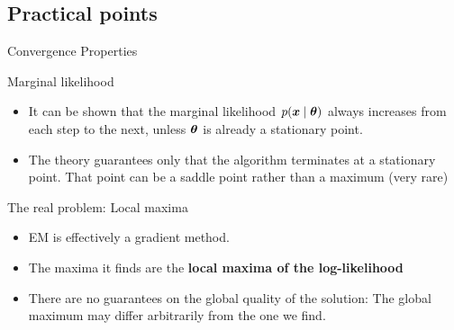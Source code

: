 \documentclass[10pt]{beamer}
\begin{document}
\subsection{Practical points}
\begin{frame}{Convergence Properties}
\footnotesize
\begin{sblock}{Marginal likelihood}
\begin{itemize}
\item It can be shown that the marginal likelihood $p({\boldsymbol x} \; | \; {\boldsymbol \theta})$ always increases from each step to the next, unless ${\boldsymbol \theta}$ is already a stationary point.
\item The theory guarantees only that the algorithm terminates at a stationary point.  That point can be a saddle point rather than a maximum (very rare)

\end{itemize}
\end{sblock}
\pause
\begin{sblock}{The real problem: Local maxima}
\begin{minipage}{.6\textwidth}
\begin{itemize}
\item EM is effectively a gradient method.
\item The maxima it finds are the \bf{local maxima of the log-likelihood}
\item There are no guarantees on the global quality of the solution: The global maximum may differ arbitrarily from the one we find.
\end{itemize}
\end{minipage}
\hfill
\begin{minipage}{.35\textwidth}
\end{minipage}


\end{sblock}
\end{frame}
\end{document}
